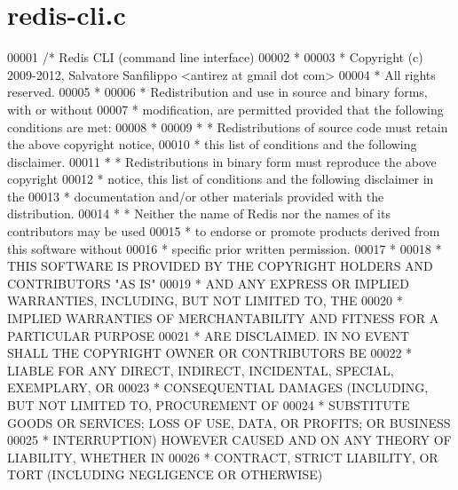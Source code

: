 \hypertarget{redis-cli_8c_source}{}\section{redis-\/cli.c}
\label{redis-cli_8c_source}

\begin{DoxyCode}
00001 \textcolor{comment}{/* Redis CLI (command line interface)}
00002 \textcolor{comment}{ *}
00003 \textcolor{comment}{ * Copyright (c) 2009-2012, Salvatore Sanfilippo <antirez at gmail dot com>}
00004 \textcolor{comment}{ * All rights reserved.}
00005 \textcolor{comment}{ *}
00006 \textcolor{comment}{ * Redistribution and use in source and binary forms, with or without}
00007 \textcolor{comment}{ * modification, are permitted provided that the following conditions are met:}
00008 \textcolor{comment}{ *}
00009 \textcolor{comment}{ *   * Redistributions of source code must retain the above copyright notice,}
00010 \textcolor{comment}{ *     this list of conditions and the following disclaimer.}
00011 \textcolor{comment}{ *   * Redistributions in binary form must reproduce the above copyright}
00012 \textcolor{comment}{ *     notice, this list of conditions and the following disclaimer in the}
00013 \textcolor{comment}{ *     documentation and/or other materials provided with the distribution.}
00014 \textcolor{comment}{ *   * Neither the name of Redis nor the names of its contributors may be used}
00015 \textcolor{comment}{ *     to endorse or promote products derived from this software without}
00016 \textcolor{comment}{ *     specific prior written permission.}
00017 \textcolor{comment}{ *}
00018 \textcolor{comment}{ * THIS SOFTWARE IS PROVIDED BY THE COPYRIGHT HOLDERS AND CONTRIBUTORS "AS IS"}
00019 \textcolor{comment}{ * AND ANY EXPRESS OR IMPLIED WARRANTIES, INCLUDING, BUT NOT LIMITED TO, THE}
00020 \textcolor{comment}{ * IMPLIED WARRANTIES OF MERCHANTABILITY AND FITNESS FOR A PARTICULAR PURPOSE}
00021 \textcolor{comment}{ * ARE DISCLAIMED. IN NO EVENT SHALL THE COPYRIGHT OWNER OR CONTRIBUTORS BE}
00022 \textcolor{comment}{ * LIABLE FOR ANY DIRECT, INDIRECT, INCIDENTAL, SPECIAL, EXEMPLARY, OR}
00023 \textcolor{comment}{ * CONSEQUENTIAL DAMAGES (INCLUDING, BUT NOT LIMITED TO, PROCUREMENT OF}
00024 \textcolor{comment}{ * SUBSTITUTE GOODS OR SERVICES; LOSS OF USE, DATA, OR PROFITS; OR BUSINESS}
00025 \textcolor{comment}{ * INTERRUPTION) HOWEVER CAUSED AND ON ANY THEORY OF LIABILITY, WHETHER IN}
00026 \textcolor{comment}{ * CONTRACT, STRICT LIABILITY, OR TORT (INCLUDING NEGLIGENCE OR OTHERWISE)}

\end{DoxyCode}
